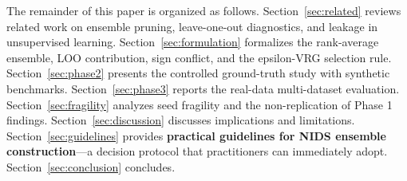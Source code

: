 The remainder of this paper is organized as follows. Section~\ref{sec:related} reviews related work on ensemble pruning, leave-one-out diagnostics, and leakage in unsupervised learning. Section~\ref{sec:formulation} formalizes the rank-average ensemble, LOO contribution, sign conflict, and the epsilon-VRG selection rule. Section~\ref{sec:phase2} presents the controlled ground-truth study with synthetic benchmarks. Section~\ref{sec:phase3} reports the real-data multi-dataset evaluation. Section~\ref{sec:fragility} analyzes seed fragility and the non-replication of Phase 1 findings. Section~\ref{sec:discussion} discusses implications and limitations. Section~\ref{sec:guidelines} provides \textbf{practical guidelines for NIDS ensemble construction}---a decision protocol that practitioners can immediately adopt. Section~\ref{sec:conclusion} concludes.
